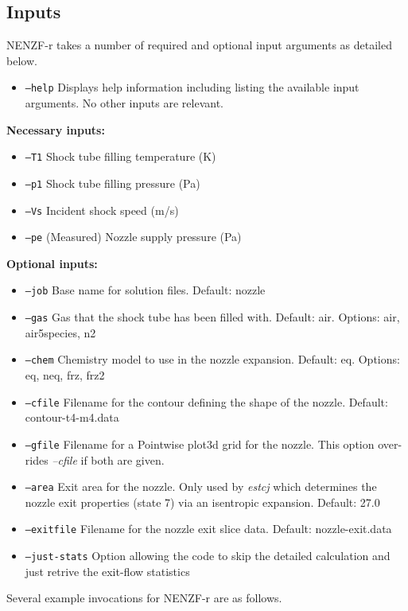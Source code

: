 \subsection{Inputs}
NENZF-r takes a number of required and optional input arguments as detailed below.
\begin{itemize}
\item[] \texttt{--help} Displays help information including listing the available input arguments. No other inputs are relevant. \end{itemize}
\textbf{Necessary inputs:} \begin{itemize}
\item[] \texttt{--T1} Shock tube filling temperature (K) 
\item[] \texttt{--p1} Shock tube filling pressure (Pa)
\item[] \texttt{--Vs} Incident shock speed (m/s)
\item[] \texttt{--pe} (Measured) Nozzle supply pressure (Pa) \end{itemize}
\textbf{Optional inputs:}\begin{itemize}
\item[] \texttt{--job} Base name for solution files. Default: nozzle
\item[] \texttt{--gas} Gas that the shock tube has been filled with. Default: air. Options: air, air5species, n2
\item[] \texttt{--chem} Chemistry model to use in the nozzle expansion. Default: eq. Options: eq, neq, frz, frz2
\item[] \texttt{--cfile} Filename for the contour defining the shape of the nozzle. Default: contour-t4-m4.data
\item[] \texttt{--gfile} Filename for a Pointwise plot3d grid for the nozzle. This option over-rides \textit{--cfile} if both are given.
\item[] \texttt{--area} Exit area for the nozzle. Only used by \textit{estcj} which determines the nozzle exit properties (state 7) via an isentropic expansion. Default: 27.0
\item[] \texttt{--exitfile} Filename for the nozzle exit slice data. Default: nozzle-exit.data
\item[] \texttt{--just-stats} Option allowing the code to skip the detailed calculation and just retrive the exit-flow statistics
\end{itemize}
Several example invocations for NENZF-r are as follows.
